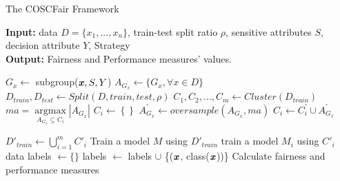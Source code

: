 
\begin{algorithm}[H]
\begin{small}
    \caption{The COSCFair Framework}\label{pseudocode} 
    \begin{flushleft}
    \textbf{Input:} data $D = \{x_1,...,x_n\}$, train-test split ratio $\rho$, sensitive attributes $S$, decision attribute $Y$, Strategy\\
    \noindent\textbf{Output:} Fairness and Performance measures' values.
    \end{flushleft}
	\begin{algorithmic}[1]
	    \State $G_x \leftarrow$ subgroup($\textbf{\textit{x}}, S, Y$) \hspace{1ex}
		\EndFor
		\State $A_{G_x}\leftarrow \{G_x, \forall x \in D\}$ \hspace{2ex}
		\State $D_{train}, D_{test} \leftarrow Split(D, train, test, \rho)$
	    \State $C_1, C_2, \dots, C_m \leftarrow Cluster(D_{train})$  \hspace{2ex}
	    \State $ma = \underset{A_{G_{x}}\subseteq C_{i}}{\operatorname{argmax}}\left| A_{G_{x}} \right|$
	    \State $C_{i} \gets \left\{  \right\}$
	        \State $A^{'}_{G_{x}}\gets oversample\left( A_{G_{x}}, ma \right)$
	        \State $C_{i} \gets C^{'}_{i}\cup A^{'}_{G_{x}}$
	        \EndFor
		\EndFor
		
		\State $D'_{train}\leftarrow \bigcup_{i=1}^m C'_i$
		\State Train a model $M$ using $D'_{train}$
		\EndIf
		        \State train a model $M_i$ using $C'_i$ data
		    \EndFor
		\EndIf
		\State labels $\leftarrow \{\}$
		\State labels $\leftarrow$ labels $\cup$ \{($\textbf{\textit{x}}$, class($\textbf{\textit{x}}$))\}
		\EndFor
		\State Calculate fairness and performance measures %
		\EndFor
		
	\end{algorithmic} 
\end{small}
\end{algorithm} 





